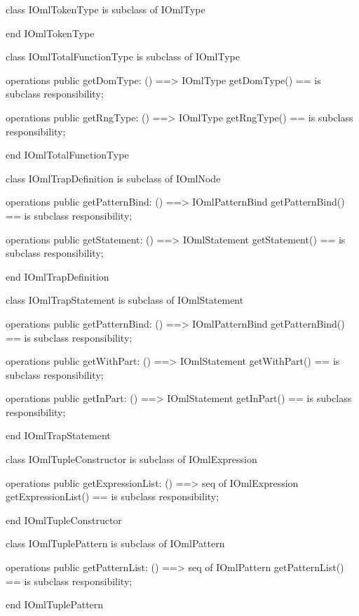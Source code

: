 \begin{vdm_al}
class IOmlTokenType
 is subclass of IOmlType

end IOmlTokenType
\end{vdm_al}

\begin{vdm_al}
class IOmlTotalFunctionType
 is subclass of IOmlType

operations
  public getDomType: () ==> IOmlType
  getDomType() == is subclass responsibility;

operations
  public getRngType: () ==> IOmlType
  getRngType() == is subclass responsibility;

end IOmlTotalFunctionType
\end{vdm_al}

\begin{vdm_al}
class IOmlTrapDefinition
 is subclass of IOmlNode

operations
  public getPatternBind: () ==> IOmlPatternBind
  getPatternBind() == is subclass responsibility;

operations
  public getStatement: () ==> IOmlStatement
  getStatement() == is subclass responsibility;

end IOmlTrapDefinition
\end{vdm_al}

\begin{vdm_al}
class IOmlTrapStatement
 is subclass of IOmlStatement

operations
  public getPatternBind: () ==> IOmlPatternBind
  getPatternBind() == is subclass responsibility;

operations
  public getWithPart: () ==> IOmlStatement
  getWithPart() == is subclass responsibility;

operations
  public getInPart: () ==> IOmlStatement
  getInPart() == is subclass responsibility;

end IOmlTrapStatement
\end{vdm_al}

\begin{vdm_al}
class IOmlTupleConstructor
 is subclass of IOmlExpression

operations
  public getExpressionList: () ==> seq of IOmlExpression
  getExpressionList() == is subclass responsibility;

end IOmlTupleConstructor
\end{vdm_al}

\begin{vdm_al}
class IOmlTuplePattern
 is subclass of IOmlPattern

operations
  public getPatternList: () ==> seq of IOmlPattern
  getPatternList() == is subclass responsibility;

end IOmlTuplePattern
\end{vdm_al}

